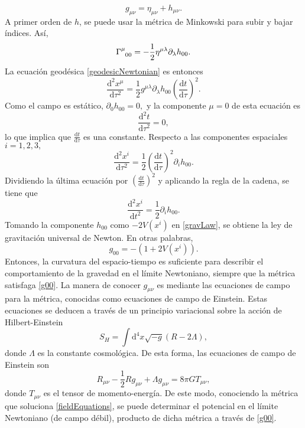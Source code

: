 $$g_{\mu\nu}=\eta_{\mu\nu}+h_{\mu\nu}.$$
A primer orden de $h$, se puede usar la métrica de Minkowski para subir y bajar índices. Así,
\begin{equation}
	\Gamma\indices{^\mu_{00}}=-\frac{1}{2}\eta^{\mu\lambda}\partial_\lambda h_{00}.
\end{equation}
La ecuación geodésica \eqref{geodesicNewtonian} es entonces
\begin{equation}
\frac{\mathrm{d}^2x^\mu}{\mathrm{d}\tau^2}=\frac{1}{2}g^{\mu\lambda}\partial_{\lambda}h_{00} \left( \frac{\mathrm{d} t}{\mathrm{d} \tau}\right)^2.
\end{equation}
Como el campo es estático, $\partial_0 h_{00}=0,$ y la componente $\mu=0$ de esta ecuación es
$$\frac{\mathrm{d}^2 t}{\mathrm{d}\tau^2}=0,$$
lo que implica que $\frac{\mathrm{d} t}{\mathrm{d} \tau}$ es una constante. Respecto a las componentes espaciales $i=1,2,3,$
\begin{equation}
\frac{\mathrm{d}^2x^i}{\mathrm{d}\tau^2}=\frac{1}{2}\left( \frac{\mathrm{d} t}{\mathrm{d} \tau}\right)^2 \partial_{i}h_{00}. 
\end{equation}
Dividiendo la última ecuación por $\left( \frac{\mathrm{d} t}{\mathrm{d} \tau}\right)^2$ y aplicando la regla de la cadena, se tiene que
\begin{equation}\label{gravLaw}
	\frac{\mathrm{d}^2x^i}{\mathrm{d}t^2}=\frac{1}{2} \partial_i h_{00}.
\end{equation}
Tomando la componente $h_{00}$ como $-2V(x^i)$ en \eqref{gravLaw}, se obtiene la ley de gravitación universal de Newton. En otras palabras,
\begin{equation}\label{g00}
	\boxed{g_{00}=-\left(1+2V(x^i)\right).}
\end{equation}
Entonces, la curvatura del espacio-tiempo es suficiente para describir el comportamiento de la gravedad en el límite Newtoniano, siempre que la métrica satisfaga \eqref{g00}. La manera de conocer $g_{\mu\nu}$ es mediante las ecuaciones de campo para la métrica, conocidas como ecuaciones de campo de Einstein. Estas ecuaciones se deducen a través de un principio variacional sobre la acción de Hilbert-Einstein
\begin{equation}
	S_H=\int \mathrm{d}^4x\sqrt{-g}\left(R-2\Lambda\right),
\end{equation}
donde $\Lambda$ es la constante cosmológica. De esta forma, las ecuaciones de campo de Einstein son
\begin{equation}\label{fieldEquations}
	R_{\mu\nu}-\frac{1}{2}Rg_{\mu\nu}+\Lambda g_{\mu\nu}=8\pi G T_{\mu\nu},
\end{equation}
donde $T_{\mu\nu}$ es el tensor de momento-energía. De este modo, conociendo la métrica que soluciona \eqref{fieldEquations}, se puede determinar el potencial en el límite Newtoniano (de campo débil), producto de dicha métrica a través de \eqref{g00}. 